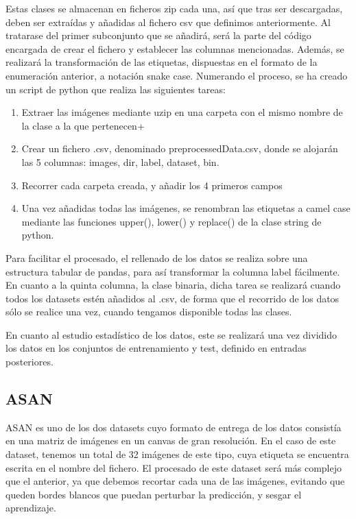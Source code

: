 Estas clases se almacenan en ficheros zip cada una, así que tras ser descargadas, deben ser extraídas y añadidas al fichero csv que definimos anteriormente. Al tratarase del primer subconjunto que se añadirá, será la parte del código encargada de crear el fichero y establecer las columnas mencionadas. Además, se realizará la transformación de las etiquetas, dispuestas en el formato de la enumeración anterior, a notación snake case. Numerando el proceso, se ha creado un script de python que realiza las siguientes tareas:

\begin{enumerate}
	\item Extraer las imágenes mediante uzip en una carpeta con el mismo nombre de la clase a la que pertenecen+
	\item Crear un fichero .csv, denominado preprocessedData.csv, donde se alojarán las 5 columnas: images, dir, label, dataset, bin.
	\item Recorrer cada carpeta creada, y añadir los 4 primeros campos
	\item Una vez añadidas todas las imágenes, se renombran las etiquetas a camel case mediante las funciones upper(), lower() y replace() de la clase string de python.
\end{enumerate}

Para facilitar el procesado, el rellenado de los datos se realiza sobre una estructura tabular de pandas, para así transformar la columna label fácilmente.
En cuanto a la quinta columna, la clase binaria, dicha tarea se realizará cuando todos los datasets estén añadidos al .csv, de forma que el recorrido de los datos sólo se realice una vez, cuando tengamos disponible todas las clases. 

En cuanto al estudio estadístico de los datos, este se realizará una vez dividido los datos en los conjuntos de entrenamiento y test, definido en entradas posteriores.

\subsection{ASAN}

ASAN es uno de los dos datasets cuyo formato de entrega de los datos consistía en una matriz de imágenes en un canvas de gran resolución. En el caso de este dataset, tenemos un total de 32 imágenes de este tipo, cuya etiqueta se encuentra escrita en el nombre del fichero.
El procesado de este dataset será más complejo que el anterior, ya que debemos recortar cada una de las imágenes, evitando que queden bordes blancos que puedan perturbar la predicción, y sesgar el aprendizaje.


